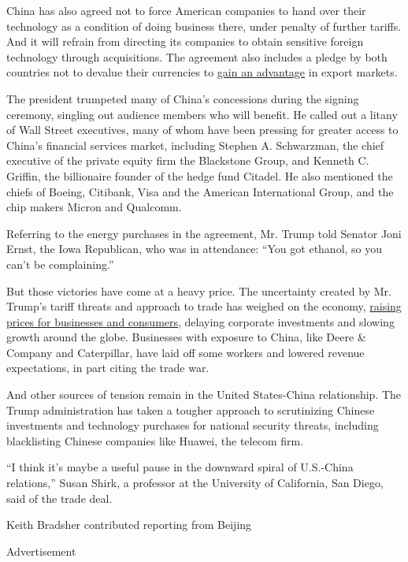 China has also agreed not to force American companies to hand over their
technology as a condition of doing business there, under penalty of
further tariffs. And it will refrain from directing its companies to
obtain sensitive foreign technology through acquisitions. The agreement
also includes a pledge by both countries not to devalue their currencies
to
\href{https://www.nytimes.com/2019/08/05/business/china-currency.html}{gain
an advantage} in export markets.

The president trumpeted many of China's concessions during the signing
ceremony, singling out audience members who will benefit. He called out
a litany of Wall Street executives, many of whom have been pressing for
greater access to China's financial services market, including Stephen
A. Schwarzman, the chief executive of the private equity firm the
Blackstone Group, and Kenneth C. Griffin, the billionaire founder of the
hedge fund Citadel. He also mentioned the chiefs of Boeing, Citibank,
Visa and the American International Group, and the chip makers Micron
and Qualcomm.

Referring to the energy purchases in the agreement, Mr. Trump told
Senator Joni Ernst, the Iowa Republican, who was in attendance: ``You
got ethanol, so you can't be complaining.''

But those victories have come at a heavy price. The uncertainty created
by Mr. Trump's tariff threats and approach to trade has weighed on the
economy,
\href{https://www.nytimes.com/2020/01/06/business/economy/trade-war-tariffs.html}{raising
prices for businesses and consumers}, delaying corporate investments and
slowing growth around the globe. Businesses with exposure to China, like
Deere \& Company and Caterpillar, have laid off some workers and lowered
revenue expectations, in part citing the trade war.

And other sources of tension remain in the United States-China
relationship. The Trump administration has taken a tougher approach to
scrutinizing Chinese investments and technology purchases for national
security threats, including blacklisting Chinese companies like Huawei,
the telecom firm.

``I think it's maybe a useful pause in the downward spiral of U.S.-China
relations,'' Susan Shirk, a professor at the University of California,
San Diego, said of the trade deal.

Keith Bradsher contributed reporting from Beijing

Advertisement

